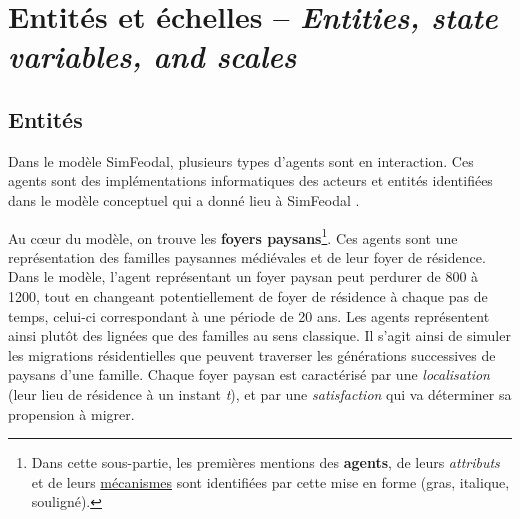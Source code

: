 \let\orisectionmark\sectionmark
\renewcommand\sectionmark[1]{}%
\section[Entités et échelles -- \textit{Entities, state variables, and scales}]{Entités et échelles -- \large{\textit{Entities, state variables, and scales}}}
\orisectionmark{Entités et échelles}
\let\sectionmark\orisectionmark

\vspace{-.5em}
\subsection{Entités \label{subsec:entites}}


%		

Dans le modèle SimFeodal, plusieurs types d'agents sont en interaction. Ces agents sont des implémentations informatiques des acteurs et entités identifiées dans le modèle conceptuel qui a donné lieu à SimFeodal \autocite[voir][Tableau 1, \ppno~309--310]{cura_transition_2017}.

 Au cœur du modèle, on trouve les \textbf{foyers paysans}\footnote{
	Dans cette sous-partie, les premières mentions des \textbf{agents}, de leurs \textit{attributs} et de leurs \ul{mécanismes} sont identifiées par cette mise en forme (gras, italique, souligné).
}.
Ces agents sont une représentation des familles paysannes médiévales et de leur foyer de résidence.
Dans le modèle, l'agent représentant un foyer paysan peut perdurer de 800 à 1200, tout en changeant potentiellement de foyer de résidence à chaque pas de temps, celui-ci correspondant à une période de 20 ans.
Les agents représentent ainsi plutôt des lignées que des familles au sens classique.
Il s'agit ainsi de simuler les migrations résidentielles que peuvent traverser les générations successives de paysans d'une famille.
Chaque foyer paysan est caractérisé par une \textit{localisation} (leur lieu de résidence à un instant \textit{t}), et par une \textit{satisfaction} qui va déterminer sa propension à migrer.

